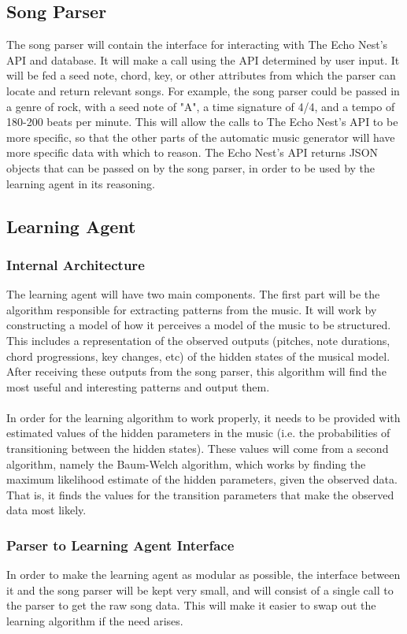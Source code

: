 \documentclass{article}
\begin{document}
\subsection{Song Parser}
The song parser will contain the interface for interacting with The Echo Nest's API and database. It will make a call using the API determined by user input. It will be fed a seed note, chord, key, or other attributes from which the parser can locate and return relevant songs. For example, the song parser could be passed in a genre of rock, with a seed note of "A", a time signature of 4/4, and a tempo of 180-200 beats per minute. This will allow the calls to The Echo Nest's API to be more specific, so that the other parts of the automatic music generator will have more specific data with which to reason. The Echo Nest's API returns JSON objects that can be passed on by the song parser, in order to be used by the learning agent in its reasoning.

\subsection{Learning Agent}
\subsubsection{Internal Architecture}
The learning agent will have two main components. The first part will be the algorithm responsible for extracting patterns from the music. It will work by constructing a model of how it perceives a model of the music to be structured. This includes a representation of the observed outputs (pitches, note durations, chord progressions, key changes, etc) of the hidden states of the musical model. After receiving these outputs from the song parser, this algorithm will find the most useful and interesting patterns and output them.\\
\\
In order for the learning algorithm to work properly, it needs to be provided with estimated values of the hidden parameters in the music (i.e. the probabilities of transitioning between the hidden states). These values will come from a second algorithm, namely the Baum-Welch algorithm, which works by finding the maximum likelihood estimate of the hidden parameters, given the observed data. That is, it finds the values for the transition parameters that make the observed data most likely. 

\subsubsection{Parser to Learning Agent Interface}
In order to make the learning agent as modular as possible, the interface between it and the song parser will be kept very small, and will consist of a single call to the parser to get the raw song data. This will make it easier to swap out the learning algorithm if the need arises.
\end{document}
